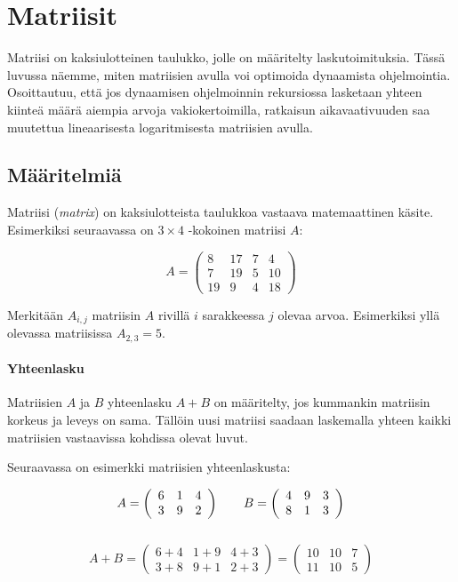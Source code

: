 \chapter{Matriisit}

Matriisi on kaksiulotteinen taulukko,
jolle on määritelty laskutoimituksia.
Tässä luvussa näemme, miten matriisien
avulla voi optimoida dynaamista ohjelmointia.
Osoittautuu, että jos dynaamisen ohjelmoinnin rekursiossa
lasketaan yhteen kiinteä määrä aiempia arvoja
vakiokertoimilla,
ratkaisun aikavaativuuden saa muutettua lineaarisesta
logaritmisesta matriisien avulla.

\section{Määritelmiä}

Matriisi (\textit{matrix}) on
kaksiulotteista taulukkoa
vastaava matemaattinen käsite.
Esimerkiksi seuraavassa on $3 \times 4$ -kokoinen
matriisi $A$:

\[ A = \left( \begin{array}{ccccc}
8 & 17 & 7 & 4 \\
7 & 19 & 5 & 10 \\
19 & 9 & 4 & 18 \end{array} \right)\] 

Merkitään $A_{i,j}$ matriisin $A$ rivillä $i$
sarakkeessa $j$ olevaa arvoa.
Esimerkiksi yllä olevassa matriisissa
$A_{2,3}=5$.

\subsubsection*{Yhteenlasku}

Matriisien $A$ ja $B$ yhteenlasku $A+B$ on määritelty,
jos kummankin matriisin korkeus ja leveys on sama.
Tällöin uusi matriisi saadaan laskemalla
yhteen kaikki matriisien vastaavissa kohdissa olevat luvut.

Seuraavassa on esimerkki
matriisien yhteenlaskusta:

\[
A = \left( \begin{array}{ccc}
6 & 1 & 4 \\
3 & 9 & 2 \end{array} \right)
\hspace{20px}
B = \left( \begin{array}{ccc}
4 & 9 & 3 \\
8 & 1 & 3 \end{array} \right)
\]
~\\
\[
A+B = 
\left( \begin{array}{ccc}
6+4 & 1+9 & 4+3 \\
3+8 & 9+1 & 2+3 \end{array} \right)
=
\left( \begin{array}{ccc}
10 & 10 & 7 \\
11 & 10 & 5 \end{array} \right)
\] 

